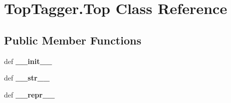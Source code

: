 \hypertarget{classTopTagger_1_1Top}{\section{Top\-Tagger.\-Top Class Reference}
\label{classTopTagger_1_1Top}
}
\subsection*{Public Member Functions}
\begin{DoxyCompactItemize}
\item 
\hypertarget{classTopTagger_1_1Top_abad89dad65df72031cf3adf48c182f34}{def {\bfseries \-\_\-\-\_\-init\-\_\-\-\_\-}}\label{classTopTagger_1_1Top_abad89dad65df72031cf3adf48c182f34}

\item 
\hypertarget{classTopTagger_1_1Top_a067729c8437c2ace6a974c62cf874a50}{def {\bfseries \-\_\-\-\_\-str\-\_\-\-\_\-}}\label{classTopTagger_1_1Top_a067729c8437c2ace6a974c62cf874a50}

\item 
\hypertarget{classTopTagger_1_1Top_acc9c36369f671d145e50950810485593}{def {\bfseries \-\_\-\-\_\-repr\-\_\-\-\_\-}}\label{classTopTagger_1_1Top_acc9c36369f671d145e50950810485593}

\end{DoxyCompactItemize}
